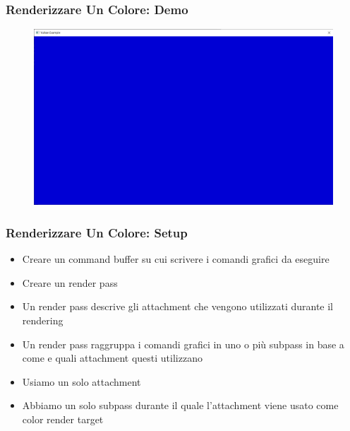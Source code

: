\begin{frame}
\frametitle{Renderizzare Un Colore: Demo}
\begin{figure}[ht]
    \centering
    \includegraphics[scale=0.25]{images/SlidesClearWindow/ClearWindow.png}
\end{figure}
\end{frame}

\begin{frame}
\frametitle{Renderizzare Un Colore: Setup}

\begin{itemize}
\item Creare un command buffer su cui scrivere i comandi grafici da eseguire
\item Creare un render pass
\item Un render pass descrive gli attachment che vengono utilizzati durante il rendering
\item Un render pass raggruppa i comandi grafici in uno o più subpass in base a come e quali attachment questi utilizzano
\item Usiamo un solo attachment
\item Abbiamo un solo subpass durante il quale l'attachment viene usato come color render target
\end{itemize}
\end{frame}

